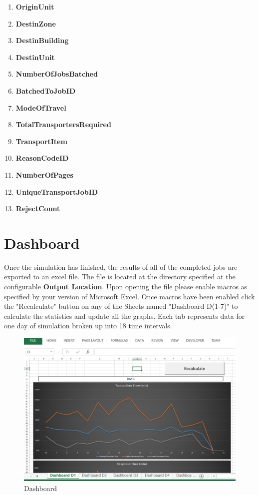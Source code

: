 \documentclass[paper=letter, fontsize=10pt]{scrartcl}
\numberwithin{equation}{section}		%
\numberwithin{figure}{section}			%
\numberwithin{table}{section}				%
\begin{document}
\begin{enumerate}
	\item \textbf{OriginUnit}
	\item \textbf{DestinZone}
	\item \textbf{DestinBuilding}
	\item \textbf{DestinUnit}
	\item \textbf{NumberOfJobsBatched}
	\item \textbf{BatchedToJobID}
	\item \textbf{ModeOfTravel}
	\item \textbf{TotalTransportersRequired}
	\item \textbf{TransportItem}	
	\item \textbf{ReasonCodeID}
	\item \textbf{NumberOfPages}
	\item \textbf{UniqueTransportJobID}
	\item \textbf{RejectCount}
	\end{enumerate}
	
\newpage
\section{Dashboard}
Once the simulation has finished, the results of all of the completed jobs are exported to an excel file. The file is located at the directory specified at the configurable \textbf{Output Location}. Upon opening the file please enable macros as specified by your version of Microsoft Excel. Once macros have been enabled click the "Recalculate" button on any of the Sheets named "Dashboard D(1-7)" to calculate the statistics and update all the graphs. Each tab represents data for one day of simulation broken up into 18 time intervals.

	\begin{figure}[!htbp]
	\begin{center}
		\includegraphics[width=1\columnwidth, height=0.4\textheight, keepaspectratio]{Dashboard.png}
		\caption{Dashboard}
	\end{center}
	\end{figure}
	
\end{document}

